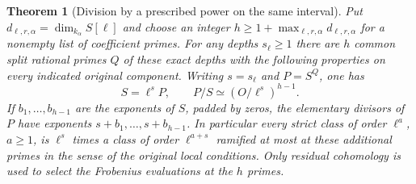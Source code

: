 \documentclass[a4paper,11pt]{article}
\newtheorem{theorem}[proposition]{Theorem}
\theoremstyle{definition}
\theoremstyle{remark}
\numberwithin{equation}{section}
\begin{document}
\begin{theorem}[Division by a prescribed power on the same interval]
\label{thm:tamedivision618}
Put \(d_{\ell,r,\alpha}=\dim_{k_\alpha}S[\ell]\) and choose an integer
\(h\ge1+\max_{\ell,r,\alpha}d_{\ell,r,\alpha}\) for a nonempty
list of coefficient primes. For any depths \(s_\ell\ge1\) there
are \(h\) common split rational primes \(Q\) of these exact depths
with the following properties on every indicated original component.
Writing \(s=s_\ell\) and \(P=S^Q\), one has
\[
             S=\ell^sP,\qquad
             P/S\simeq(O/\ell^s)^{h-1}.
\]
If \(b_1,\ldots,b_{h-1}\) are the exponents of \(S\), padded by
zeros, the elementary divisors of \(P\) have exponents
\(s+b_1,\ldots,s+b_{h-1}\). In particular every strict class of
order \(\ell^a\), \(a\ge1\), is \(\ell^s\) times a class of order
\(\ell^{a+s}\) ramified at most at these additional primes in the
sense of the original local conditions. Only residual cohomology
is used to select the Frobenius evaluations at the \(h\) primes.
\end{theorem}
\end{document}
